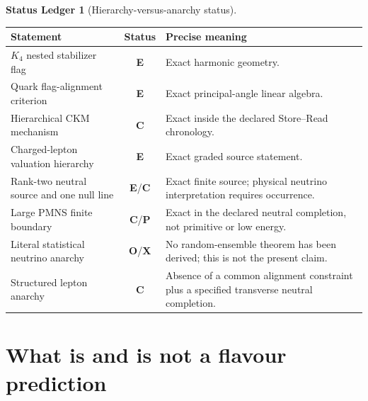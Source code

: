 \documentclass[11pt,oneside,openany]{book}
\numberwithin{equation}{chapter}
\theoremstyle{definition}
\newtheorem{ledger}[theorem]{Status Ledger}
\theoremstyle{remark}
\newcommand{\statusE}{\textcolor{ExactColor}{\textbf{E}}}
\newcommand{\statusC}{\textcolor{CondColor}{\textbf{C}}}
\newcommand{\statusP}{\textcolor{PostColor}{\textbf{P}}}
\newcommand{\statusO}{\textcolor{OpenColor}{\textbf{O}}}
\newcommand{\statusX}{\textcolor{SuperColor}{\textbf{X}}}
\begin{document}
\begin{ledger}[Hierarchy-versus-anarchy status]
\begin{center}
\begin{tabularx}{0.97\textwidth}{@{}p{}cX@{}}
\toprule
Statement & Status & Precise meaning\\
\midrule
\(K_4\) nested stabilizer flag
& \statusE
& Exact harmonic geometry.\\
Quark flag-alignment criterion
& \statusE
& Exact principal-angle linear algebra.\\
Hierarchical CKM mechanism
& \statusC
& Exact inside the declared Store--Read chronology.\\
Charged-lepton valuation hierarchy
& \statusE
& Exact graded source statement.\\
Rank-two neutral source and one null line
& \statusE/\statusC
& Exact finite source; physical neutrino interpretation requires occurrence.\\
Large PMNS finite boundary
& \statusC/\statusP
& Exact in the declared neutral completion, not primitive or low energy.\\
Literal statistical neutrino anarchy
& \statusO/\statusX
& No random-ensemble theorem has been derived; this is not the present claim.\\
Structured lepton anarchy
& \statusC
& Absence of a common alignment constraint plus a specified transverse
neutral completion.\\
\bottomrule
\end{tabularx}
\end{center}
\end{ledger}


\chapter{What is and is not a flavour prediction}
\label{ch:flavour-status}
\end{document}
